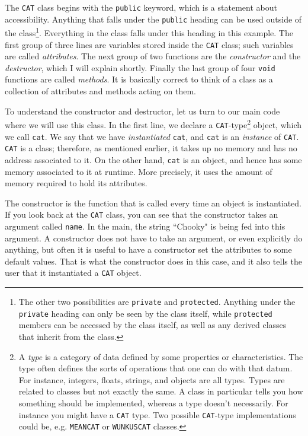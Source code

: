The \texttt{CAT} class begins with the \texttt{public} keyword, which
is a statement about accessibility. Anything that falls under the
\texttt{public} heading can be used outside of the class\footnote{The other
two possibilities are \texttt{private} and \texttt{protected}. 
Anything under the \texttt{private} heading
can only be seen by the class itself, while \texttt{protected} members can be accessed 
by the class itself, as well as any derived classes that inherit from the class.}. 
Everything in the class falls
under this heading in this example. The first group of three lines
are variables stored inside the \texttt{CAT} class; such variables
are called {\it attributes}. The next group of two functions are
the {\it constructor} and the {\it destructor}, which I will explain
shortly. Finally the last group of four \texttt{void} functions are 
called {\it methods}. It is basically correct to think of a class as a
collection of attributes and methods acting on them.\\

\begin{code*}
\end{code*}

To understand the constructor and destructor, let us turn to our main
code where we will use this class. In the first line, we declare a
\texttt{CAT}-type\footnote{A {\it type} is a category of data
defined by some properties or characteristics. The type often defines the sorts
of operations that one can do with that datum. For instance, integers, floats,
strings, and objects are all types. Types are related to classes but not exactly
the same. A class in particular tells you how something should be implemented,
whereas a type doesn't necessarily. For instance you might have a \texttt{CAT}
type. Two possible \texttt{CAT}-type implementations could be, e.g.
\texttt{MEANCAT} or \texttt{WUNKUSCAT} classes.} object, which we call \texttt{cat}. We say that we have
{\it instantiated} \texttt{cat}, and \texttt{cat} is an {\it instance}
of \texttt{CAT}. \texttt{CAT} is a class; therefore, as mentioned
earlier, it takes up no memory and has no address associated to it.
On the other hand, \texttt{cat} is an object, and hence has some
memory associated to it at runtime. More precisely, it uses the
amount of memory required to hold its attributes.

The constructor is the function that is called every time an object is
instantiated. If you look back at the \texttt{CAT} class, you can see that
the constructor takes an argument called \texttt{name}. In the main,
the string ``Chooky" is being fed into this argument. A constructor does
not have to take an argument, or even explicitly do anything, but often
it is useful to have a constructor set the attributes to some default values.
That is what the constructor does in this case, and it also tells the
user that it instantiated a \texttt{CAT} object.\\


